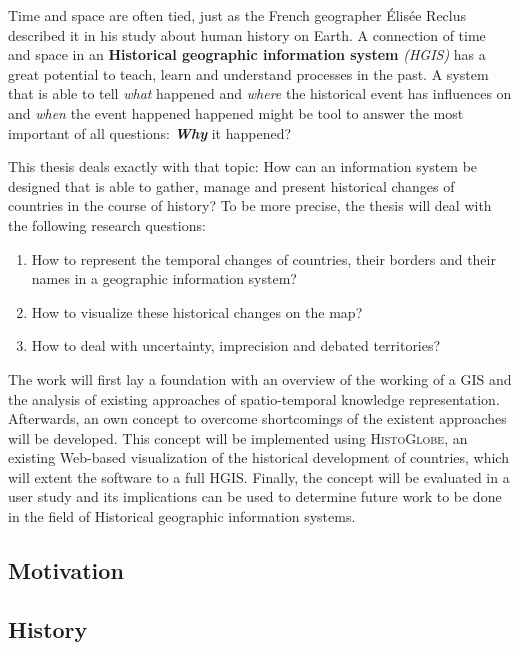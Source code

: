 Time and space are often tied, just as the French geographer Élisée Reclus described it in his study about human history on Earth. A connection of time and space in an \textbf{Historical geographic information system} \emph{(HGIS)} has a great potential to teach, learn and understand processes in the past. A system that is able to tell \emph{what} happened and \emph{where} the historical event has influences on and \emph{when} the event happened happened might be tool to answer the most important of all questions: \textbf{\emph{Why}} it happened?

This thesis deals exactly with that topic: How can an information system be designed that is able to gather, manage and present historical changes of countries in the course of history? To be more precise, the thesis will deal with the following research questions:

\begin{enumerate}
  \item How to represent the temporal changes of countries, their borders and their names in a geographic information system?
  \item How to visualize these historical changes on the map?
  \item How to deal with uncertainty, imprecision and debated territories?
\end{enumerate}

The work will first lay a foundation with an overview of the working of a GIS and the analysis of existing approaches of spatio-temporal knowledge representation. Afterwards, an own concept to overcome shortcomings of the existent approaches will be developed. This concept will be implemented using \textsc{HistoGlobe}, an existing Web-based visualization of the historical development of countries, which will extent the software to a full HGIS. Finally, the concept will be evaluated in a user study and its implications can be used to determine future work to be done in the field of Historical geographic information systems.

\subsection{Motivation} %
\label{sub:motivation}



\subsection{History} %
\label{sub:history}

